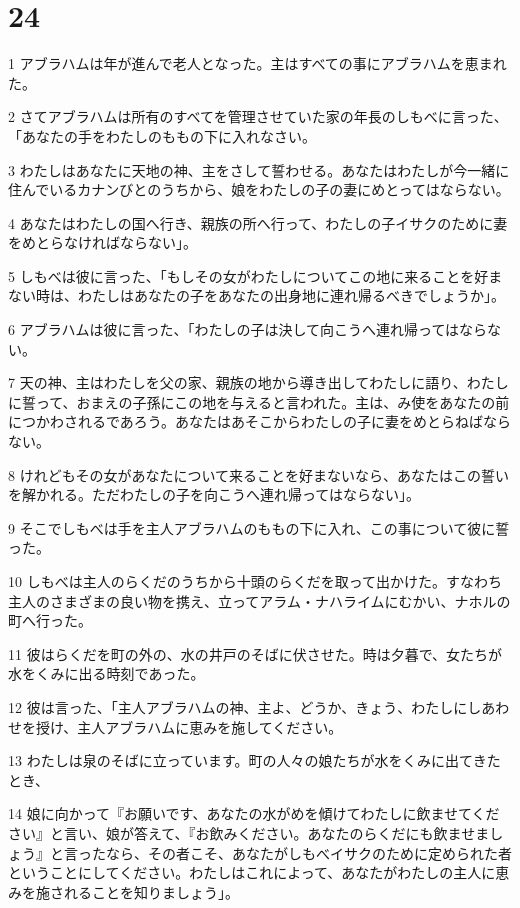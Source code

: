\chapter{24}

\par 1 アブラハムは年が進んで老人となった。主はすべての事にアブラハムを恵まれた。
\par 2 さてアブラハムは所有のすべてを管理させていた家の年長のしもべに言った、「あなたの手をわたしのももの下に入れなさい。
\par 3 わたしはあなたに天地の神、主をさして誓わせる。あなたはわたしが今一緒に住んでいるカナンびとのうちから、娘をわたしの子の妻にめとってはならない。
\par 4 あなたはわたしの国へ行き、親族の所へ行って、わたしの子イサクのために妻をめとらなければならない」。
\par 5 しもべは彼に言った、「もしその女がわたしについてこの地に来ることを好まない時は、わたしはあなたの子をあなたの出身地に連れ帰るべきでしょうか」。
\par 6 アブラハムは彼に言った、「わたしの子は決して向こうへ連れ帰ってはならない。
\par 7 天の神、主はわたしを父の家、親族の地から導き出してわたしに語り、わたしに誓って、おまえの子孫にこの地を与えると言われた。主は、み使をあなたの前につかわされるであろう。あなたはあそこからわたしの子に妻をめとらねばならない。
\par 8 けれどもその女があなたについて来ることを好まないなら、あなたはこの誓いを解かれる。ただわたしの子を向こうへ連れ帰ってはならない」。
\par 9 そこでしもべは手を主人アブラハムのももの下に入れ、この事について彼に誓った。
\par 10 しもべは主人のらくだのうちから十頭のらくだを取って出かけた。すなわち主人のさまざまの良い物を携え、立ってアラム・ナハライムにむかい、ナホルの町へ行った。
\par 11 彼はらくだを町の外の、水の井戸のそばに伏させた。時は夕暮で、女たちが水をくみに出る時刻であった。
\par 12 彼は言った、「主人アブラハムの神、主よ、どうか、きょう、わたしにしあわせを授け、主人アブラハムに恵みを施してください。
\par 13 わたしは泉のそばに立っています。町の人々の娘たちが水をくみに出てきたとき、
\par 14 娘に向かって『お願いです、あなたの水がめを傾けてわたしに飲ませてください』と言い、娘が答えて、『お飲みください。あなたのらくだにも飲ませましょう』と言ったなら、その者こそ、あなたがしもべイサクのために定められた者ということにしてください。わたしはこれによって、あなたがわたしの主人に恵みを施されることを知りましょう」。
